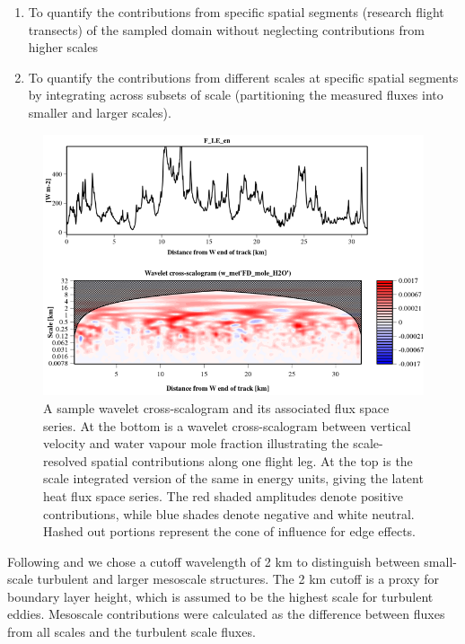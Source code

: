 \documentclass[draft]{agujournal2019}
\begin{document}
\begin{enumerate}
    \item To quantify the contributions from specific spatial segments (research flight transects) of the sampled domain without neglecting contributions from higher scales 
    \item To quantify the contributions from different scales at specific spatial segments by integrating across subsets of scale (partitioning the measured fluxes into smaller and larger scales). 
\end{enumerate}
 \begin{figure}
 \noindent\includegraphics[width=\textwidth]{wavelet_ex.png}
\caption{A sample wavelet cross-scalogram and its associated flux space series. At the bottom is a wavelet cross-scalogram between vertical velocity and water vapour mole fraction illustrating the scale-resolved spatial contributions along one flight leg. At the top is the scale integrated version of the same in energy units, giving the latent heat flux space series. The red shaded amplitudes denote positive contributions, while blue shades denote negative and white neutral. Hashed out portions represent the cone of influence for edge effects.}
\label{fig:wavelet_ex}
 \end{figure}

Following  and  we chose a cutoff wavelength of 2 km to distinguish between small-scale turbulent and larger mesoscale structures. The 2 km cutoff is a proxy for boundary layer height, which is assumed to be the highest scale for turbulent eddies. Mesoscale contributions were calculated as the difference between fluxes from all scales and the turbulent scale fluxes.
\end{document}
